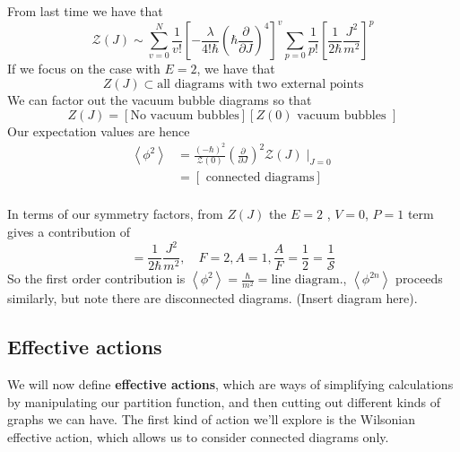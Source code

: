 \documentclass[11pt, oneside]{article}   	%
\theoremstyle{slanted}
\begin{document}
From last time 
we have that \[
\mathcal{ Z } \left( J  \right) 
\sim \sum_{ v = 0 } ^{ N } \frac{1}{v ! } \left[  
- \frac{\lambda}{4 ! \hbar } \left( \hbar \frac{\partial  }{\partial  J }   \right)  
^ 4 \right]  ^ v \sum _{ p = 0  } \frac{1}{p ! } \left[  
\frac{1}{2 \hbar } \frac{J ^ 2 }{ m ^ 2 } \right]   ^ p 
\] 
If we focus on the case with $ E   =   2 $, 
we have that 
\[
Z \left( J  \right)  \subset \text{all diagrams with two external points}
\] 
We can factor out the vacuum bubble diagrams so that 
\[
Z ( J )  = \left[  \text{No vacuum bubbles}  \right]  \left[  
Z ( 0 ) \text{ vacuum bubbles }\right] 
\] 
Our expectation values 
are hence 
\begin{align*}
\left< \phi ^ 2  \right> &=  \frac{ \left(  - \hbar  \right)^ 2   }{ 
\mathcal{ Z } ( 0 ) } \left( \frac{\partial  }{\partial  J }   \right)^ 2  
\mathcal{ Z } ( J ) \mid _{ J = 0 } \\ 
&=  \left[  \text{ connected diagrams} \right]  \\
\end{align*}

In terms of our symmetry factors, 
from $ Z ( J ) $ the $ E = 2 $ , $ V  = 0 $, $ P = 1 $ 
term 
gives a contribution of 
\[
= \frac{1}{2 \hbar } \frac{J^2}{m ^ 2 } , \quad F = 2, A = 1 , \frac{A}{F } 
= \frac{1}{2 }  = \frac{1}{\mathcal{ S } }
\] So the first order contribution is 
$ \left< \phi ^ 2  \right> = \frac{\hbar}{m ^ 2 }  = \text{line diagram}$., 
$ \left< \phi ^{ 2n }  \right> $ proceeds similarly, but note 
there are disconnected diagrams. 
(Insert diagram here). 

\subsection{Effective actions}

We will now define \textbf{effective actions}, 
which are ways of simplifying calculations 
by manipulating our partition function, and then cutting 
out different kinds of graphs we can have. 
The first kind of action we'll explore 
is the Wilsonian effective action, 
which allows us to consider connected diagrams only. 
\end{document}
